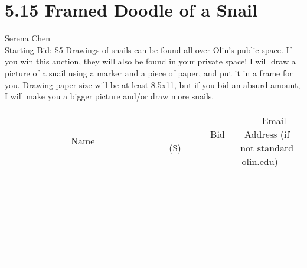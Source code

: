 \documentclass[11pt]{article}
\begin{document}
\section*{5.15 Framed Doodle of a Snail}
Serena Chen
\\
Starting Bid: \$5
\newline
Drawings of snails can be found all over Olin's public space. If you win this auction, they will also be found in your private space! I will draw a picture of a snail using a marker and a piece of paper, and put it in a frame for you. Drawing paper size will be at least 8.5x11, but if you bid an absurd amount, I will make you a bigger picture and/or draw more snails.
\\[6ex]
\begin{tabular}{c c c}
~~~~~~~~~~~~~Name~~~~~~~~~~~~~ & ~~~~~~~~~Bid (\$)~~~~~~~~~  & ~~~Email Address (if not standard olin.edu)~~~\\
 & & \\
\hline
 & & \\
\hline
 & & \\
\hline
 & & \\
\hline
 & & \\
\hline
 & & \\
\hline
 & & \\
\hline
 & & \\
\hline
 & & \\
\hline
 & & \\
\hline
 & & \\
\hline
 & & \\
\hline
 & & \\
\hline
 & & \\
\hline
 & & \\
\hline
 & & \\
\hline
 & & \\
\hline
 & & \\
\hline
 & & \\
\hline
 & & \\
\hline
 & & \\
\hline
 & & \\
\hline
 & & \\
\hline
 & & \\
\hline
 & & \\
\hline
 & & \\
\hline
\end{tabular}
\newpage
\end{document}
